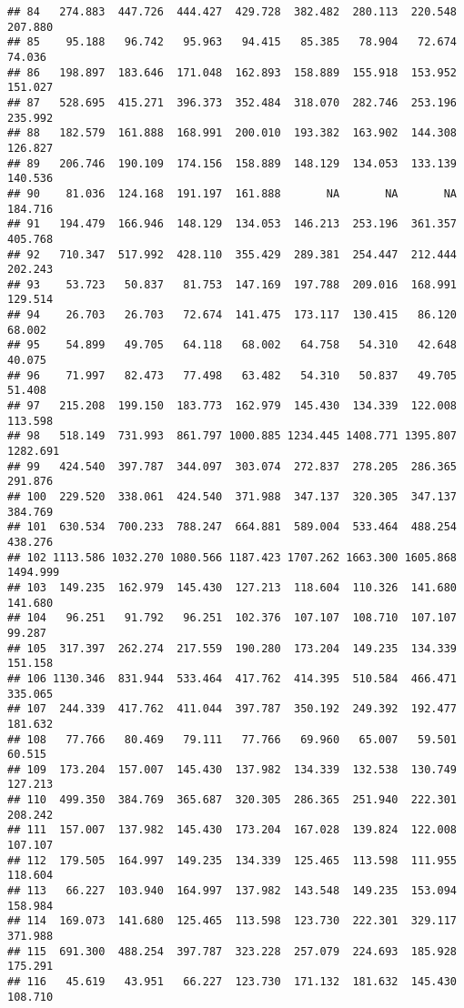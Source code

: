 \documentclass[
]{article}
\begin{document}
\begin{verbatim}
## 84   274.883  447.726  444.427  429.728  382.482  280.113  220.548  207.880
## 85    95.188   96.742   95.963   94.415   85.385   78.904   72.674   74.036
## 86   198.897  183.646  171.048  162.893  158.889  155.918  153.952  151.027
## 87   528.695  415.271  396.373  352.484  318.070  282.746  253.196  235.992
## 88   182.579  161.888  168.991  200.010  193.382  163.902  144.308  126.827
## 89   206.746  190.109  174.156  158.889  148.129  134.053  133.139  140.536
## 90    81.036  124.168  191.197  161.888       NA       NA       NA  184.716
## 91   194.479  166.946  148.129  134.053  146.213  253.196  361.357  405.768
## 92   710.347  517.992  428.110  355.429  289.381  254.447  212.444  202.243
## 93    53.723   50.837   81.753  147.169  197.788  209.016  168.991  129.514
## 94    26.703   26.703   72.674  141.475  173.117  130.415   86.120   68.002
## 95    54.899   49.705   64.118   68.002   64.758   54.310   42.648   40.075
## 96    71.997   82.473   77.498   63.482   54.310   50.837   49.705   51.408
## 97   215.208  199.150  183.773  162.979  145.430  134.339  122.008  113.598
## 98   518.149  731.993  861.797 1000.885 1234.445 1408.771 1395.807 1282.691
## 99   424.540  397.787  344.097  303.074  272.837  278.205  286.365  291.876
## 100  229.520  338.061  424.540  371.988  347.137  320.305  347.137  384.769
## 101  630.534  700.233  788.247  664.881  589.004  533.464  488.254  438.276
## 102 1113.586 1032.270 1080.566 1187.423 1707.262 1663.300 1605.868 1494.999
## 103  149.235  162.979  145.430  127.213  118.604  110.326  141.680  141.680
## 104   96.251   91.792   96.251  102.376  107.107  108.710  107.107   99.287
## 105  317.397  262.274  217.559  190.280  173.204  149.235  134.339  151.158
## 106 1130.346  831.944  533.464  417.762  414.395  510.584  466.471  335.065
## 107  244.339  417.762  411.044  397.787  350.192  249.392  192.477  181.632
## 108   77.766   80.469   79.111   77.766   69.960   65.007   59.501   60.515
## 109  173.204  157.007  145.430  137.982  134.339  132.538  130.749  127.213
## 110  499.350  384.769  365.687  320.305  286.365  251.940  222.301  208.242
## 111  157.007  137.982  145.430  173.204  167.028  139.824  122.008  107.107
## 112  179.505  164.997  149.235  134.339  125.465  113.598  111.955  118.604
## 113   66.227  103.940  164.997  137.982  143.548  149.235  153.094  158.984
## 114  169.073  141.680  125.465  113.598  123.730  222.301  329.117  371.988
## 115  691.300  488.254  397.787  323.228  257.079  224.693  185.928  175.291
## 116   45.619   43.951   66.227  123.730  171.132  181.632  145.430  108.710

\end{verbatim}
\end{document}
